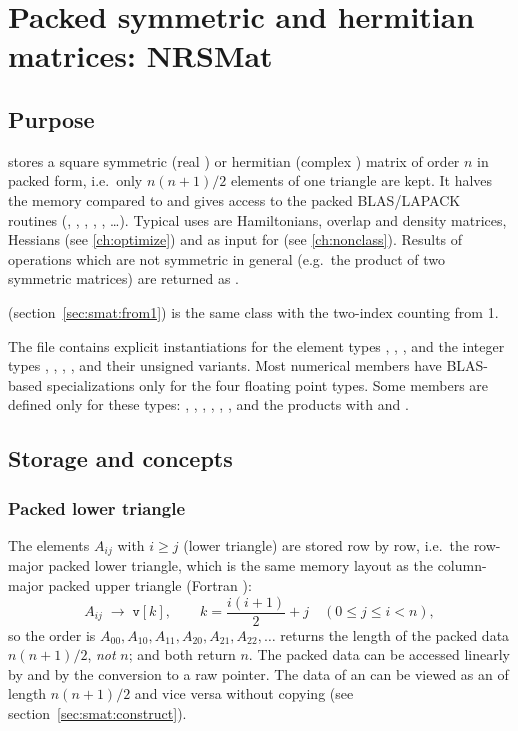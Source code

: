 \chapter{Packed symmetric and hermitian matrices: NRSMat}\label{ch:smat}

\section{Purpose}\label{sec:smat:purpose}
 stores a square symmetric (real ) or hermitian (complex )
matrix of order $n$ in packed form, i.e.\ only $n(n+1)/2$ elements of one triangle are kept.
It halves the memory compared to  and gives access to the packed BLAS/LAPACK
routines (, , , , , \ldots).
Typical uses are Hamiltonians, overlap and density matrices, Hessians (see \ref{ch:optimize})
and as input for  (see \ref{ch:nonclass}).
Results of operations which are not symmetric in general (e.g.\ the product of two symmetric
matrices) are returned as .

 (section~\ref{sec:smat:from1}) is the same class with the
two-index  counting from 1.

The file  contains explicit instantiations for the element types , ,
,  and the integer types , , , ,  and
their unsigned variants.
Most numerical members have BLAS-based specializations only for the four floating point types. Some members are defined only for these types:
, , , , , , 
and the products with  and .

\section{Storage and concepts}\label{sec:smat:storage}

\subsection{Packed lower triangle}
The elements $A_{ij}$ with $i\ge j$ (lower triangle) are stored row by row, i.e.\ the
row-major packed lower triangle, which is the same memory layout as the column-major packed
upper triangle (Fortran ):
\begin{equation}\label{eq:smat:index}
A_{ij} \;\to\; \mathtt{v}[k],\qquad k = \frac{i(i+1)}{2}+j \quad (0\le j\le i<n),
\end{equation}
so the order is $A_{00}, A_{10}, A_{11}, A_{20}, A_{21}, A_{22}, \ldots$
 returns the length of the packed data $n(n+1)/2$, \emph{not} $n$;  and
 both return $n$.
The packed data can be accessed linearly by  and by the conversion to a raw pointer.
The data of an  can be viewed as an  of length $n(n+1)/2$ and
vice versa without copying (see section~\ref{sec:smat:construct}).

